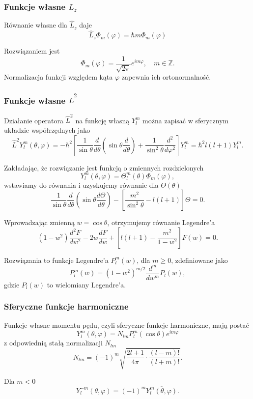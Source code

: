 \subsubsection*{Funkcje własne $\hat{L}_z$}
Równanie własne dla $\hat{L}_z$ daje
$$
\hat{L}_z \Phi_m(\varphi) = \hbar m \Phi_m(\varphi)
$$

Rozwiązaniem jest
$$
\Phi_m(\varphi) = \frac{1}{\sqrt{2\pi}} e^{im\varphi}, \quad m \in \mathbb{Z}.
$$
Normalizacja funkcji względem kąta $\varphi$ zapewnia ich ortonormalność.

\subsubsection*{Funkcje własne $\hat{L}^2$}
Działanie operatora $\hat{L}^2$ na funkcję własną $Y^m_l$ można zapisać
w sferycznym układzie współrzędnych jako
$$
\hat{L}^2 Y_l^m(\theta, \varphi) = -\hbar^2 \left[ \frac{1}{\sin\theta} \frac{d}{d\theta} \left( \sin\theta \frac{d}{d\theta} \right) + \frac{1}{\sin^2\theta} \frac{d^2}{d\varphi^2} \right] Y_l^m = \hbar^2 l(l+1) Y_l^m.
$$

Zakładając, że rozwiązanie jest funkcją o zmiennych rozdzielonych
$$
Y_l^m(\theta, \varphi) = \Theta_l^m(\theta) \Phi_m(\varphi),
$$
wstawiamy do równania i uzyskujemy równanie dla $\Theta(\theta)$
$$
\frac{1}{\sin\theta} \frac{d}{d\theta} \left( \sin\theta \frac{d\Theta}{d\theta} \right) - \left[ \frac{m^2}{\sin^2\theta} - l(l+1) \right] \Theta = 0.
$$

Wprowadzając zmienną $w = \cos\theta$, otrzymujemy równanie Legendre'a
$$
(1 - w^2) \frac{d^2 F}{dw^2} - 2w \frac{dF}{dw} + \left[ l(l+1) - \frac{m^2}{1 - w^2} \right] F(w) = 0.
$$

Rozwiązania to funkcje Legendre'a $P_l^m(w)$, dla $m \geq 0$, zdefiniowane jako
$$
P_l^m(w) = (1 - w^2)^{m/2} \frac{d^m}{dw^m} P_l(w),
$$
gdzie $P_l(w)$ to wielomiany Legendre'a.

\subsubsection*{Sferyczne funkcje harmoniczne}
Funkcje własne momentu pędu, czyli sferyczne funkcje harmoniczne, mają postać
$$
Y_l^m(\theta, \varphi) = N_{lm} P_l^m(\cos\theta) e^{im\varphi}
$$
z odpowiednią stałą normalizacji $N_{lm}$
$$
N_{lm} = (-1)^m \sqrt{\frac{2l + 1}{4\pi} \cdot \frac{(l - m)!}{(l + m)!}}.
$$

Dla $m < 0$
$$
Y_l^{-m}(\theta, \varphi) = (-1)^m \overline{Y_l^m(\theta, \varphi)}.
$$

